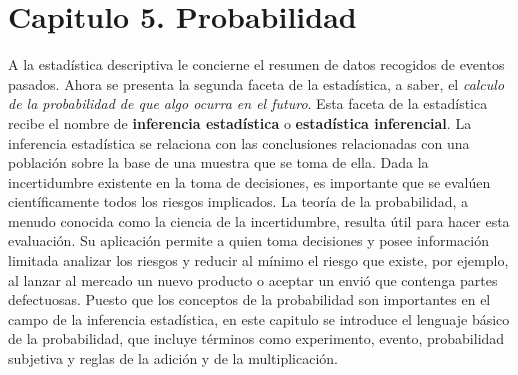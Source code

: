 \documentclass[]{article}
\begin{document}
\section{Capitulo 5. Probabilidad}
A la estadística descriptiva le concierne el resumen de datos recogidos de eventos pasados. Ahora se presenta la segunda faceta de la estadística, a saber, el \textit{calculo de la probabilidad de que algo ocurra en el futuro}. Esta faceta de la estadística recibe el nombre de \textbf{inferencia estadística} o \textbf{estadística inferencial}. La inferencia estadística se relaciona con las conclusiones relacionadas con una población sobre la base de una muestra que se toma de ella. Dada la incertidumbre existente en la toma de decisiones, es importante que se evalúen científicamente todos los riesgos implicados. La teoría de la probabilidad, a menudo conocida como la ciencia de la incertidumbre, resulta útil para hacer esta evaluación. Su aplicación permite a quien toma decisiones y posee información limitada analizar los riesgos y reducir al mínimo el riesgo que existe, por ejemplo, al lanzar al mercado un nuevo producto o aceptar un envió que contenga partes defectuosas. Puesto que los conceptos de la probabilidad son importantes en el campo de la inferencia estadística, en este capitulo se introduce el lenguaje básico de la probabilidad, que incluye términos como experimento, evento, probabilidad subjetiva y reglas de la adición y de la multiplicación.
\end{document}

